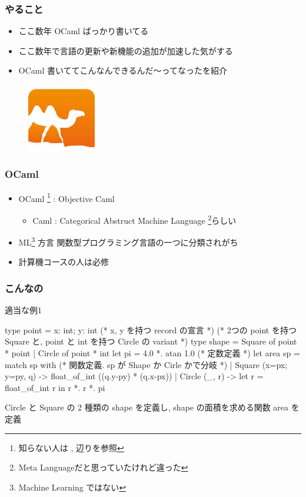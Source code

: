 \documentclass[dvipdfmx,14pt,notheorems,aspectratio=169]{beamer}
\theoremstyle{definition}
\begin{document}
    \begin{frame}[fragile]\frametitle{やること}
        \begin{itemize}
            \item ここ数年 OCaml ばっかり書いてる
            \item ここ数年で言語の更新や新機能の追加が加速した気がする
            \item OCaml 書いててこんなんできるんだ〜ってなったを紹介
        \end{itemize}
        \begin{figure}[htbp]
            \begin{center}
                \includegraphics[width=3cm]{camel.jpeg}
            \end{center}
        \end{figure}
    \end{frame}

    \begin{frame}[fragile]\frametitle{OCaml}
        \begin{itemize}
            \item OCaml \footnote{知らない人は \cite{igarashi}, \cite{ksuenaga} 辺りを参照} : Objective Caml
            \begin{itemize}
                \item Caml : Categorical Abstruct Machine Language \footnote{Meta Languageだと思っていたけれど違った}らしい
            \end{itemize}
            \item ML\footnote{Machine Learning ではない} 方言 関数型プログラミング言語の一つに分類されがち
            \item 計算機コースの人は必修
        \end{itemize}
    \end{frame}

    \begin{frame}[fragile]\frametitle{こんなの}
        \begin{exampleblock}{適当な例1}
            \scriptsize
            \begin{verbatimtab}
type point = { x: int; y: int } (* x, y を持つ record の宣言 *)
(* 2つの point を持つ Square と, point と int を持つ Circle の variant *)
type shape = Square of point * point | Circle of point * int 
let pi = 4.0 *. atan 1.0 (* 定数定義 *)
let area sp = match sp with (* 関数定義. sp が Shape か Cirle かで分岐 *)
    | Square ({x=px; y=py}, q) -> float_of_int ((q.y-py) * (q.x-px))
    | Circle (_, r) -> let r = float_of_int r in r *. r *. pi
\end{verbatimtab}
        \end{exampleblock}
        Circle と Square の 2 種類の shape を定義し, shape の面積を求める関数 area を定義
    \end{frame}
\end{document}
